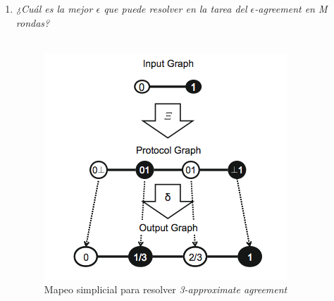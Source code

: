 \documentclass{article}
\begin{document}
\begin{enumerate}
{\begin{enumerate}
{      En la primera ronda(\textit{figura 2}) podemos decir que el complejo es el mismo
      al del problema visto en clase, esto se debe a que cada proceso ocupa el único espacio
      de memoria del cual dispone, teniendo como información inicial, lo que él dijo (0 ó 1)
      más aparte lo que leyo del otro proceso (0, 1 ó $\perp$).\\
      Lo interesante ocurre apartir de la ronda 2, ¿cuál es el complejo que resulta en la segunda
      ronda?, la respuesta es simple, el mismo complejo de la ronda 1. Aún más interesante
      ¿por que ocurre esto?, primero debemos notar que en el modelo \textit{full information} 
      saber toda la historia de la conversación que mantuvieron los dos procesos durante las M
      rondas nos da la capacidad de convertir una arista en 3 posibles mundos subsecuentes,
      como en el modelo que se nos pide en este ejercicio perdemos esa capacidad, entonces 
      no importa cuantas rondas de comuncación mantuvieron los procesos, si en todo momento solo
      existe la posibilidad de que alguno de los dos no escucho al otro o ambos se escucharon.\\
      Por lo tanto, la gráfica de vistas de la ronda M es el mostrado en la \textit{figura 2}.\\
    }
       
      \item{\textsl{¿Cuál es la mejor $\epsilon$ que puede resolver en la tarea del 
            $\epsilon$-agreement en M rondas?}\\ \\
         
          \begin{figure}
            \centering
            \includegraphics[scale=0.65]{3b_agreement.png}
            \caption{Mapeo simplicial para resolver \textit{3-approximate agreement}}
          \end{figure}
          
}
\end{enumerate}}
\end{enumerate}
\end{document}
